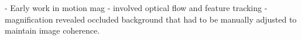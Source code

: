 \documentclass{article}
\begin{document}
- Early work in motion mag
- involved optical flow and feature tracking
- magnification revealed occluded background that had to be manually adjusted to maintain image coherence.
\end{document}
